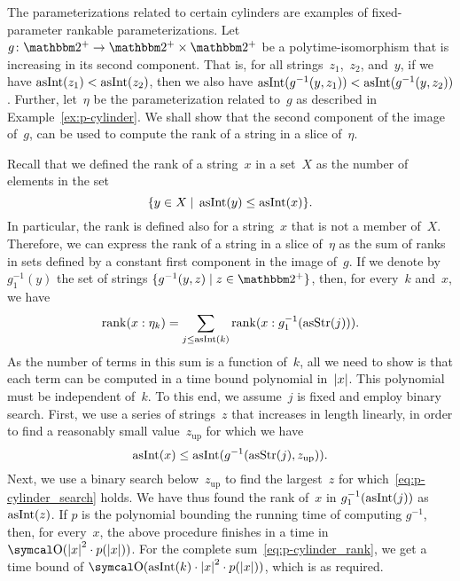 \begin{example}
\label{ex:fp-rankable}%
  The parameterizations related to certain \pdash{}cylinders are examples of fixed-parameter \pdash{}rankable parameterizations.
  Let $g\colon \binary^+ \to \binary^+ \times \binary^+$ be a polytime-isomorphism that is increasing in its second component.
  That is, for all strings~$z_1$,~$z_2$, and~$y$, if we have $\operatorname{asInt}(z_1) < \operatorname{asInt}(z_2)$, then we also have $\operatorname{asInt}(g^{-1}(y, z_1)) < \operatorname{asInt}(g^{-1}(y, z_2))$.
  Further, let~$\eta$ be the parameterization related to~$g$ as described in Example~\ref{ex:p-cylinder}.
  We shall show that the second component of the image of~$g$, can be used to compute the rank of a string in a slice of~$\eta$.

  Recall that we defined the rank of a string~$x$ in a set~$X$ as the number of elements in the set
  \begin{equation*}
    \{y \in X \;|\; \operatorname{asInt}(y) \le \operatorname{asInt}(x)\}.
  \end{equation*}
  In particular, the rank is defined also for a string~$x$ that is not a member of~$X$.
  Therefore, we can express the rank of a string in a slice of~$\eta$ as the sum of ranks in sets defined by a constant first component in the image of~$g$.
  If we denote by $g_1^{-1}(y)$ the set of strings $\{g^{-1}(y, z) \st z \in \binary^+\}$, then, for every~$k$ and~$x$, we have
  \begin{equation}
  \label{eq:p-cylinder_rank}
    \operatorname{rank}(x : \eta_k) = \sum_{j \le \operatorname{asInt}(k)} \operatorname{rank}(x : g_1^{-1}(\operatorname{asStr}(j))).
  \end{equation}
  As the number of terms in this sum is a function of~$k$, all we need to show is that each term can be computed in a time bound polynomial in~${\lvert x\rvert}$.
  This polynomial must be independent of~$k$.
  To this end, we assume~$j$ is fixed and employ binary search.
  First, we use a series of strings~$z$ that increases in length linearly, in order to find a reasonably small value~$z_\mathrm{up}$ for which we have
  \begin{equation}
  \label{eq:p-cylinder_search}
    \operatorname{asInt}(x) \le \operatorname{asInt}(g^{-1}(\operatorname{asStr}(j), z_\mathrm{up})).
  \end{equation}
  Next, we use a binary search below~$z_\mathrm{up}$ to find the largest~$z$ for which~\eqref{eq:p-cylinder_search} holds.
  We have thus found the rank of~$x$ in $g_1^{-1}(\operatorname{asInt}(j))$ as $\operatorname{asInt}(z)$.
  If $p$ is the polynomial bounding the running time of computing $g^{-1}$, then, for every~$x$, the above procedure finishes in a time in $\bigO(\length{x}^2 \cdot p(\length{x}))$.
  For the complete sum~\eqref{eq:p-cylinder_rank}, we get a time bound of $\bigO(\asNat(k) \cdot \length{x}^2 \cdot p(\length{x}))$, which is as required.
\end{example}

